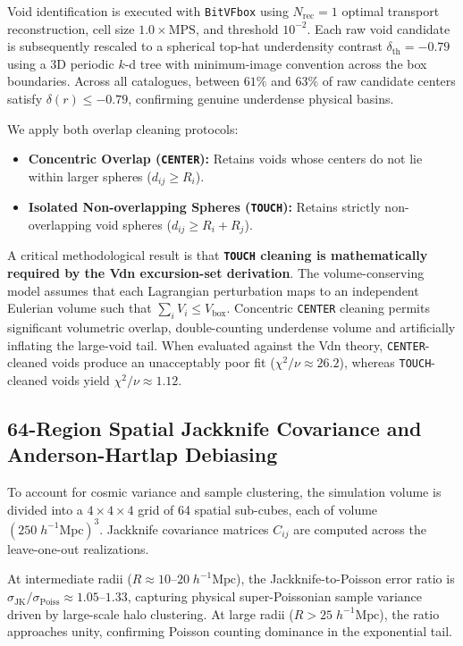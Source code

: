 \documentclass[12pt]{report}
\begin{document}
Void identification is executed with \texttt{BitVFbox} using $N_{\mathrm{rec}}=1$ optimal transport reconstruction, cell size $1.0 \times \mathrm{MPS}$, and threshold $10^{-2}$. Each raw void candidate is subsequently rescaled to a spherical top-hat underdensity contrast $\delta_{\mathrm{th}} = -0.79$ using a 3D periodic $k$-d tree with minimum-image convention across the box boundaries. Across all catalogues, between $61\%$ and $63\%$ of raw candidate centers satisfy $\delta(r) \le -0.79$, confirming genuine underdense physical basins.

We apply both overlap cleaning protocols:
\begin{itemize}
    \item \textbf{Concentric Overlap (\texttt{CENTER}):} Retains voids whose centers do not lie within larger spheres ($d_{ij} \ge R_i$).
    \item \textbf{Isolated Non-overlapping Spheres (\texttt{TOUCH}):} Retains strictly non-overlapping void spheres ($d_{ij} \ge R_i + R_j$).
\end{itemize}

A critical methodological result is that \textbf{\texttt{TOUCH} cleaning is mathematically required by the Vdn excursion-set derivation}. The volume-conserving model \citep{Jennings2013} assumes that each Lagrangian perturbation maps to an independent Eulerian volume such that $\sum_i V_i \le V_{\mathrm{box}}$. Concentric \texttt{CENTER} cleaning permits significant volumetric overlap, double-counting underdense volume and artificially inflating the large-void tail. When evaluated against the Vdn theory, \texttt{CENTER}-cleaned voids produce an unacceptably poor fit ($\chi^2/\nu \approx 26.2$), whereas \texttt{TOUCH}-cleaned voids yield $\chi^2/\nu \approx 1.12$.

\subsection{64-Region Spatial Jackknife Covariance and Anderson-Hartlap Debiasing}

To account for cosmic variance and sample clustering, the simulation volume is divided into a $4 \times 4 \times 4$ grid of 64 spatial sub-cubes, each of volume $(250\;h^{-1}\mathrm{Mpc})^3$. Jackknife covariance matrices $C_{ij}$ are computed across the leave-one-out realizations. 

At intermediate radii ($R \approx 10$--$20\;h^{-1}\mathrm{Mpc}$), the Jackknife-to-Poisson error ratio is $\sigma_{\mathrm{JK}} / \sigma_{\mathrm{Poiss}} \approx 1.05$--$1.33$, capturing physical super-Poissonian sample variance driven by large-scale halo clustering. At large radii ($R > 25\;h^{-1}\mathrm{Mpc}$), the ratio approaches unity, confirming Poisson counting dominance in the exponential tail.
\end{document}
